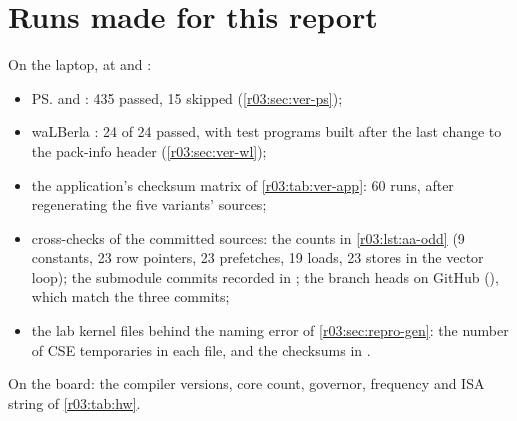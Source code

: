 \section*{Runs made for this report}
On the laptop, at \rcommitps{} and \rcommitwl:
\begin{itemize}
  \item \ps{}  and : 435 passed, 15 skipped
        (\cref{r03:sec:ver-ps});
  \item waLBerla : 24 of 24
        passed, with test programs built after the last change to the pack-info header
        (\cref{r03:sec:ver-wl});
  \item the application's checksum matrix of \cref{r03:tab:ver-app}: 60 runs, after regenerating
        the five variants' sources;
  \item cross-checks of the committed sources: the counts in \cref{r03:lst:aa-odd} (9 constants,
        23 row pointers, 23 prefetches, 19 loads, 23 stores in the vector loop); the submodule
        commits recorded in \rcommitws; the branch heads on GitHub (), which
        match the three commits;
  \item the lab kernel files behind the naming error of \cref{r03:sec:repro-gen}: the number of
        CSE temporaries in each file, and the checksums in .
\end{itemize}
On the board: the compiler versions, core count, governor, frequency and ISA string of
\cref{r03:tab:hw}.
